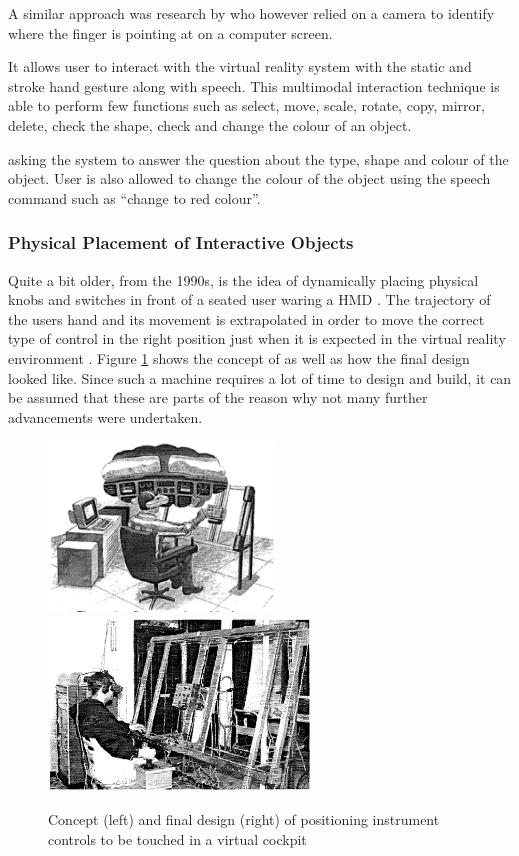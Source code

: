 A similar approach was research by \cite{Uchino2008} who however relied on a camera to identify where the finger is pointing at on a computer screen.

It allows user to interact with the virtual reality system with the static and stroke hand gesture along with speech. This multimodal interaction technique is able to perform few functions such as select, move, scale, rotate, copy, mirror, delete, check the shape, check and change the colour of an object.
\cite{Chun2015}

asking the system to answer the question about the type, shape and colour of the object. User is also allowed to change the colour of the object using the speech command such as “change to red colour”.


\subsubsection{Physical Placement of Interactive Objects}

Quite a bit older, from the 1990s, is the idea of dynamically placing physical knobs and switches in front of a seated user waring a HMD \citep{Latham1997}. The trajectory of the users hand and its movement is extrapolated in order to move the correct type of control in the right position just when it is expected in the virtual reality environment \citep{Latham1997}. Figure \ref{fig:touchcockpit} shows the concept of \cite{Latham1997} as well as how the final design looked like. Since such a machine requires a lot of time to design and build, it can be assumed that these are parts of the reason why not many further advancements were undertaken.
\begin{figure}[h]
	\begin{center}
		\includegraphics[width=6cm]{03_Figures/05_LitReview/Latham1997_Concept.png}
		\includegraphics[width=7cm]{03_Figures/05_LitReview/Latham1997_FinalDesign.png}
		\caption[Concept and final design of positioning instrument controls to be touched in a virtual cockpit]{Concept (left) and final design (right) of positioning instrument controls to be touched in a virtual cockpit \citep{Latham1997}}
		\label{fig:touchcockpit}
	\end{center}
\end{figure}


